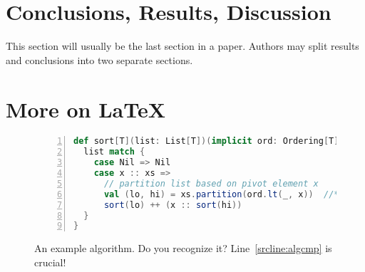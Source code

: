 \documentclass[]{rptuseminar}
\begin{document}
\section{Conclusions, Results, Discussion}
\label{sec:conclusions}

This section will usually be the last section in a paper.
Authors may split results and conclusions into two separate sections.



\section{More on \LaTeX}

\begin{figure}
\begin{lstlisting}[language=Scala,numbers=left]
def sort[T](list: List[T])(implicit ord: Ordering[T]): List[T] = {
  list match {
    case Nil => Nil
    case x :: xs =>
      // partition list based on pivot element x
      val (lo, hi) = xs.partition(ord.lt(_, x))  //*\label{srcline:algcmp}
      sort(lo) ++ (x :: sort(hi))
  }
}
\end{lstlisting}
\caption{An example algorithm. Do you recognize it? Line~\ref{srcline:algcmp} is crucial!}
\label{alg:example}
\end{figure}
\end{document}
